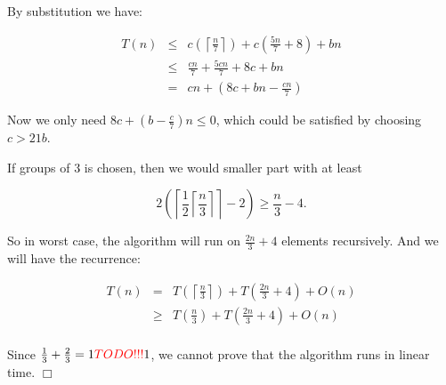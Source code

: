 \documentclass[a4paper,10pt]{article}
\newcommand{\qed}{\hfill \ensuremath{\Box}}
\newcommand{\nless}{\textcolor{red}{TODO!!!}{} }
\begin{document}
By substitution we have:

\begin{eqnarray*}
T(n)  &\leq& c\left(\left\lceil\frac{n}{7}\right\rceil\right) + c\left(\frac{5n}{7} + 8\right) + bn\\
&\leq& \frac{cn}{7} + \frac{5cn}{7} + 8c + bn\\
&=&cn + \left(8c + bn - \frac{cn}{7}\right)
\end{eqnarray*}

Now we only need $8c + \left(b - \frac{c}{7}\right)n \leq 0$, which could be satisfied by choosing $c > 21b$.

If groups of 3 is chosen, then we would smaller part with at least

$$2\left(\left\lceil\frac{1}{2}\left\lceil\frac{n}{3}\right\rceil\right\rceil -2\right) \geq \frac{n}{3} - 4.$$

So in worst case, the algorithm will run on $\frac{2n}{3} + 4$ elements recursively. And we will have the recurrence:

\begin{eqnarray*}
T(n) &=& T\left(\left\lceil\frac{n}{3}\right\rceil\right) + T\left(\frac{2n}{3} + 4\right) + O(n)\\
&\geq& T\left(\frac{n}{3}\right) + T\left(\frac{2n}{3} + 4\right) + O(n)\\
\end{eqnarray*}

Since $\frac{1}{3} + \frac{2}{3} = 1 \nless 1$,  we cannot prove that the algorithm runs in linear time.
\qed
\end{document}
